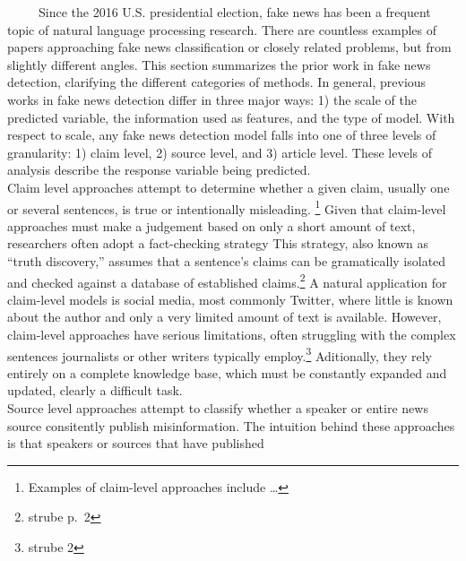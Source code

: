 \documentclass[12pt]{article}
\begin{document}
~~~~~Since the 2016 U.S. presidential election, fake news has been a
frequent topic of natural language processing research. There are
countless examples of papers approaching fake news classification or
closely related problems, but from slightly different angles. This
section summarizes the prior work in fake news detection, clarifying the
different categories of methods. In general, previous works in fake news
detection differ in three major ways: 1) the scale of the predicted
variable, the information used as features, and the type of model. With
respect to scale, any fake news detection model falls into one of three
levels of granularity: 1) claim level, 2) source level, and 3) article
level. These levels of analysis describe the response variable being
predicted.\\
\hspace*{0.333em}\hspace*{0.333em}\hspace*{0.333em}\hspace*{0.333em}\hspace*{0.333em}Claim
level approaches attempt to determine whether a given claim, usually one
or several sentences, is true or intentionally misleading. \footnote{Examples
  of claim-level approaches include \ldots{}} Given that claim-level
approaches must make a judgement based on only a short amount of text,
researchers often adopt a fact-checking strategy This strategy, also
known as ``truth discovery,'' assumes that a sentence's claims can be
gramatically isolated and checked against a database of established
claims.\footnote{strube p.~2} A natural application for claim-level
models is social media, most commonly Twitter, where little is known
about the author and only a very limited amount of text is available.
However, claim-level approaches have serious limitations, often
struggling with the complex sentences journalists or other writers
typically employ.\footnote{strube 2} Aditionally, they rely entirely on
a complete knowledge base, which must be constantly expanded and
updated, clearly a difficult task.\\
\hspace*{0.333em}\hspace*{0.333em}\hspace*{0.333em}\hspace*{0.333em}\hspace*{0.333em}Source
level approaches attempt to classify whether a speaker or entire news
source consitently publish misinformation. The intuition behind these
approaches is that speakers or sources that have published
\end{document}
